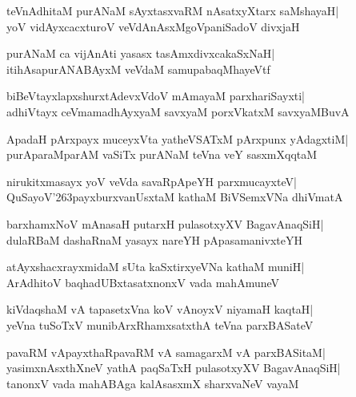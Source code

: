 \documentclass[twoside,12pt,openright]{book}
\def\S{\char'263}
\newcounter{shloka}[chapter]
\begin{document}
\begin{shloka}%
teVnAdhitaM purANaM sAyxtasxvaRM nAsatxyXtarx saMshayaH|\\
yoV vidAyxcacxturoV veVdAnAsxMgoVpaniSadoV divxjaH
\end{shloka}

\begin{shloka}%
purANaM ca vijAnAti yasasx tasAmxdivxcakaSxNaH|\\
itihAsapurANABAyxM veVdaM samupabaqMhayeVtf
\end{shloka}

\begin{shloka}%
biBeVtayxlapxshurxtAdevxVdoV mAmayaM parxhariSayxti|\\
adhiVtayx ceVmamadhAyxyaM savxyaM porxVkatxM savxyaMBuvA
\end{shloka}

\begin{shloka}%
ApadaH pArxpayx muceyxVta yatheVSATxM pArxpunx yAdagxtiM|\\
purAparaMparAM vaSiTx purANaM teVna veY sasxmXqqtaM
\end{shloka}

\begin{shloka}%
nirukitxmasayx yoV veVda savaRpApeYH parxmucayxteV|\\
QuSayoV\S payxburxvanUsxtaM kathaM BiVSemxVNa dhiVmatA
\end{shloka}

\begin{shloka}%
 barxhamxNoV mAnasaH putarxH pulasotxyXV BagavAnaqSiH|\\
dulaRBaM dashaRnaM yasayx nareYH pApasamanivxteYH
\end{shloka}

\begin{shloka}%
atAyxshacxrayxmidaM sUta kaSxtirxyeVNa kathaM muniH|\\
ArAdhitoV baqhadUBxtasatxnonxV vada mahAmuneV
\end{shloka}

\begin{shloka}%
kiVdaqshaM vA tapasetxVna koV vAnoyxV niyamaH kaqtaH|\\
yeVna tuSoTxV munibArxRhamxsatxthA teVna parxBASateV
\end{shloka}

\begin{shloka}%
pavaRM vApayxthaRpavaRM vA samagarxM vA parxBASitaM|\\
yasimxnAsxthXneV yathA paqSaTxH pulasotxyXV BagavAnaqSiH|\\
tanonxV vada mahABAga kalAsasxmX sharxvaNeV vayaM
\end{shloka}
\end{document}
